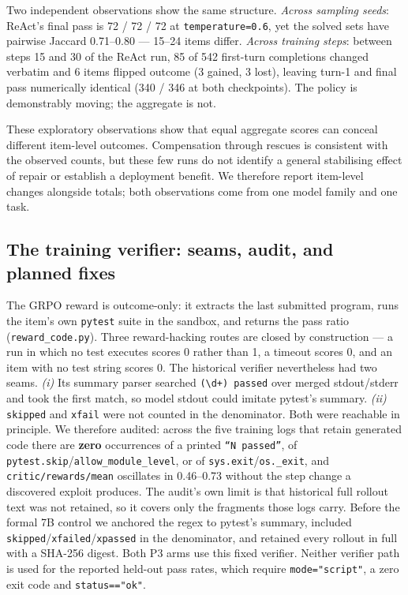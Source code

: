 Two independent observations show the same structure. \emph{Across sampling seeds}: ReAct's final
pass is 72 / 72 / 72 at \texttt{temperature=0.6}, yet the solved sets have pairwise Jaccard
0.71--0.80 --- 15--24 items differ. \emph{Across training steps}: between steps 15 and 30 of the
ReAct run, 85 of 542 first-turn completions changed verbatim and 6 items flipped outcome (3
gained, 3 lost), leaving turn-1 and final pass numerically identical (340 / 346 at both
checkpoints). The policy is demonstrably moving; the aggregate is not.

These exploratory observations show that equal aggregate scores can conceal different
item-level outcomes. Compensation through rescues is consistent with the observed counts,
but these few runs do not identify a general stabilising effect of repair or establish a
deployment benefit. We therefore report item-level changes alongside totals; both observations
come from one model family and one task.

\subsection{The training verifier: seams, audit, and planned fixes}
\label{app:verifier}

The GRPO reward is outcome-only: it extracts the last submitted program, runs the item's own
\texttt{pytest} suite in the sandbox, and returns the pass ratio (\texttt{reward\_code.py}). Three
reward-hacking routes are closed by construction --- a run in which no test executes scores 0
rather than 1, a timeout scores 0, and an item with no test string scores 0. The historical
verifier nevertheless had two seams. \emph{(i)} Its summary parser searched
\texttt{(\textbackslash d+) passed} over merged stdout/stderr and took the first match, so model
stdout could imitate pytest's summary. \emph{(ii)} \texttt{skipped} and \texttt{xfail} were not
counted in the denominator. Both were reachable in principle. We therefore audited:
across the five training logs that retain generated code there are \textbf{zero} occurrences of a
printed \texttt{``N passed''}, of \texttt{pytest.skip}/\texttt{allow\_module\_level}, or of
\texttt{sys.exit}/\texttt{os.\_exit}, and \texttt{critic/rewards/mean} oscillates in 0.46--0.73
without the step change a discovered exploit produces. The audit's own limit is that historical
full rollout text was not retained, so it covers only the fragments those logs carry. Before the
formal 7B control we anchored the regex to pytest's summary, included
\texttt{skipped}/\texttt{xfailed}/\texttt{xpassed} in the denominator, and retained every rollout
in full with a SHA-256 digest. Both P3 arms use this fixed verifier. Neither verifier path is used
for the reported held-out pass rates, which require \texttt{mode="script"}, a zero exit code and
\texttt{status=="ok"}.

